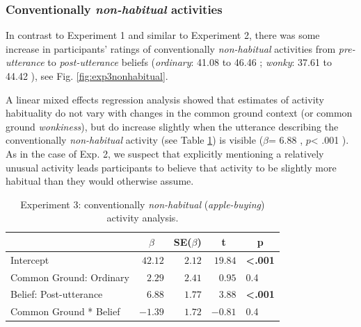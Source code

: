 \documentclass{sp}\usepackage[]{graphicx}\usepackage[]{color}
\begin{document}
\subsubsection{Conventionally \textit{non-habitual} activities}

In contrast to Experiment 1 and similar to Experiment 2, there was some increase in participants' ratings of conventionally \textit{non-habitual} activities from \textit{pre-utterance} to \textit{post-utterance} beliefs (\textit{ordinary}: %
41.08
 to %
46.46
; \textit{wonky}: %
37.61
 to %
44.42
), see Fig. \ref{fig:exp3nonhabitual}.

A linear mixed effects regression analysis showed that estimates of activity habituality do not vary with changes in the common ground context (or common ground \textit{wonkiness}), but do increase slightly when the utterance describing the conventionally \textit{non-habitual} activity (see Table \ref{tab:exp3nonhabitual}) is visible ($\beta$=%
6.88
, $p$<%
.001
).  As in the case of Exp. 2, we suspect that explicitly mentioning a relatively unusual activity leads participants to believe that activity to be slightly more habitual than they would otherwise assume.

\begin{table}[ht]
\caption{Experiment 3: conventionally \textit{non-habitual} (\textit{apple-buying}) activity analysis.\label{tab:exp3nonhabitual}} 
\begin{center}
\begin{tabular}{lrrrl}
\toprule
\multicolumn{1}{l}{}&\multicolumn{1}{c}{$\beta$}&\multicolumn{1}{c}{SE($\beta$)}&\multicolumn{1}{c}{\textbf{t}}&\multicolumn{1}{c}{\textbf{p}}\tabularnewline
\midrule
Intercept&$42.12$&$2.12$&$19.84$&\textbf{\textless .001}\tabularnewline
Common Ground: Ordinary&$ 2.29$&$2.41$&$ 0.95$&0.4\tabularnewline
Belief: Post-utterance&$ 6.88$&$1.77$&$ 3.88$&\textbf{\textless .001}\tabularnewline
Common Ground * Belief&$-1.39$&$1.72$&$-0.81$&0.4\tabularnewline
\bottomrule
\end{tabular}\end{center}
\end{table}
\end{document}
